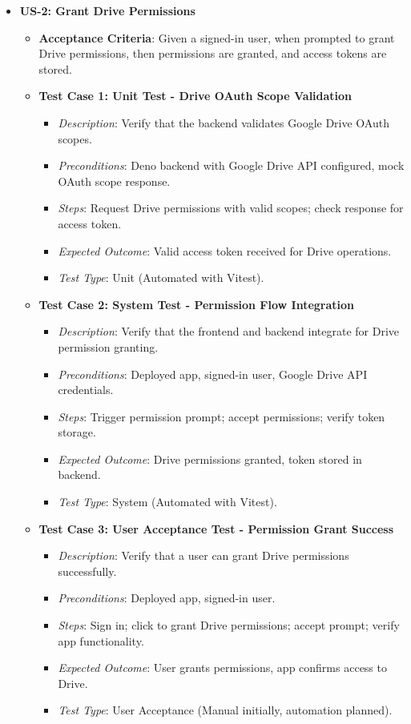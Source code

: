 \documentclass[12pt]{article}
\begin{document}
\begin{itemize}
  \item \textbf{US-2: Grant Drive Permissions}
    \begin{itemize}
      \item \textbf{Acceptance Criteria}: Given a signed-in user, when prompted to grant Drive permissions, then permissions are granted, and access tokens are stored.
      \item \textbf{Test Case 1: Unit Test - Drive OAuth Scope Validation}
        \begin{itemize}
          \item \textit{Description}: Verify that the backend validates Google Drive OAuth scopes.
          \item \textit{Preconditions}: Deno backend with Google Drive API configured, mock OAuth scope response.
          \item \textit{Steps}: Request Drive permissions with valid scopes; check response for access token.
          \item \textit{Expected Outcome}: Valid access token received for Drive operations.
          \item \textit{Test Type}: Unit (Automated with Vitest).
        \end{itemize}
      \item \textbf{Test Case 2: System Test - Permission Flow Integration}
        \begin{itemize}
          \item \textit{Description}: Verify that the frontend and backend integrate for Drive permission granting.
          \item \textit{Preconditions}: Deployed app, signed-in user, Google Drive API credentials.
          \item \textit{Steps}: Trigger permission prompt; accept permissions; verify token storage.
          \item \textit{Expected Outcome}: Drive permissions granted, token stored in backend.
          \item \textit{Test Type}: System (Automated with Vitest).
        \end{itemize}
      \item \textbf{Test Case 3: User Acceptance Test - Permission Grant Success}
        \begin{itemize}
          \item \textit{Description}: Verify that a user can grant Drive permissions successfully.
          \item \textit{Preconditions}: Deployed app, signed-in user.
          \item \textit{Steps}: Sign in; click to grant Drive permissions; accept prompt; verify app functionality.
          \item \textit{Expected Outcome}: User grants permissions, app confirms access to Drive.
          \item \textit{Test Type}: User Acceptance (Manual initially, automation planned).
        \end{itemize}
    \end{itemize}


\end{itemize}
\end{document}
